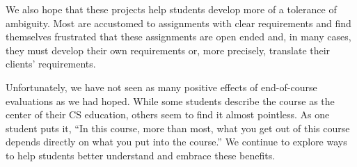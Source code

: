 We also hope that these projects help students develop more of a
tolerance of ambiguity.  Most are accustomed to assignments with
clear requirements and find themselves frustrated that these 
assignments are open ended and, in many cases, they must develop
their own requirements or, more precisely, translate their clients'
requirements.

Unfortunately, we have not seen as many positive effects of
end-of-course evaluations as we had hoped.  While some students
describe the course as the center of their CS education, others
seem to find it almost pointless.  As one student puts it, ``In this course,
more than most, what you get out of this course depends directly
on what you put into the course.''  We continue to explore ways to
help students better understand and embrace these benefits.

